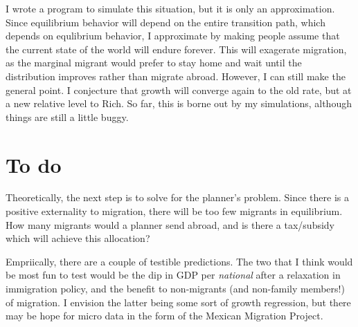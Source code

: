 \documentclass[12pt]{article}
\begin{document}
I wrote a program to simulate this situation, but it is only an approximation.  Since equilibrium behavior will depend on the entire transition path, which depends on equlibrium behavior, I approximate by making people assume that the current state of the world will endure forever.  This will exagerate migration, as the marginal migrant would prefer to stay home and wait until the distribution improves rather than migrate abroad.  However, I can still make the general point.  I conjecture that growth will converge again to the old rate, but at a new relative level to Rich.  So far, this is borne out by my simulations, although things are still a little buggy.

\section{To do}

Theoretically, the next step is to solve for the planner's problem.  Since there is a positive externality to migration, there will be too few migrants in equilibrium.  How many migrants would a planner send abroad, and is there a tax/subsidy which will achieve this allocation?

Empriically, there are a couple of testible predictions.  The two that I think would be most fun to test would be the dip in GDP per \emph{national} after a relaxation in immigration policy, and the benefit to non-migrants (and non-family members!) of migration.  I envision the latter being some sort of growth regression, but there may be hope for micro data in the form of the Mexican Migration Project.


\end{document}
